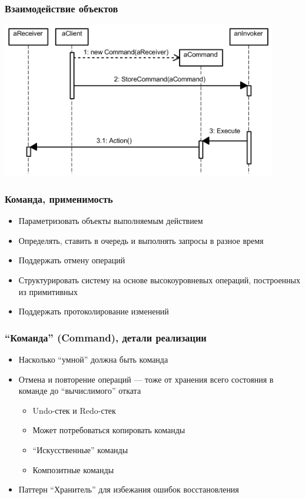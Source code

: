 \documentclass[xetex,mathserif,serif]{beamer}
\begin{document}
    \begin{frame}
        \frametitle{Взаимодействие объектов}
        \begin{center}
            \includegraphics[width=0.9\textwidth]{commandSequence.png}
        \end{center}
    \end{frame}

    \begin{frame}
        \frametitle{Команда, применимость}
        \begin{itemize}
            \item Параметризовать объекты выполняемым действием
            \item Определять, ставить в очередь и выполнять запросы в разное время
            \item Поддержать отмену операций
            \item Структурировать систему на основе высокоуровневых операций, построенных из примитивных
            \item Поддержать протоколирование изменений
        \end{itemize}
    \end{frame}

    \begin{frame}
        \frametitle{``Команда'' (Command), детали реализации}
        \begin{itemize}
            \item Насколько ``умной'' должна быть команда
            \item Отмена и повторение операций --- тоже от хранения всего состояния в команде до ``вычислимого'' отката
            \begin{itemize}
                \item Undo-стек и Redo-стек
                \item Может потребоваться копировать команды
                \item ``Искусственные'' команды
                \item Композитные команды
            \end{itemize}
            \item Паттерн ``Хранитель'' для избежания ошибок восстановления
        \end{itemize}
    \end{frame}
\end{document}
